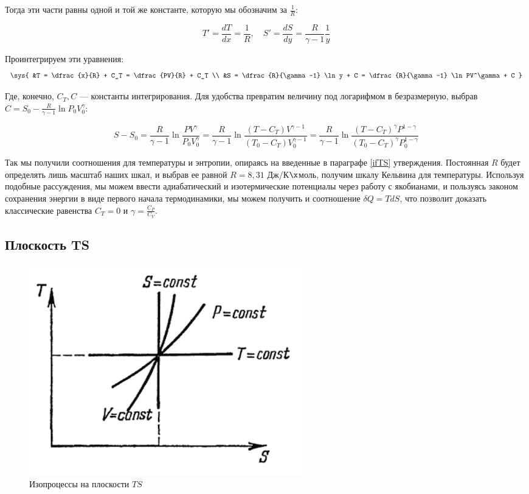 \documentclass[12pt]{kiarticle}
\newcommand{\del}{\ensuremath{\delta}}
\begin{document}
Тогда эти части равны одной и той же константе, которую мы обозначим за $ \frac{1}{R} $:

\begin{equation}\label{R}
T' = \dfrac{dT}{dx} = \dfrac{1}{R}, \quad S' = \dfrac{dS}{dy} = \dfrac{R}{\gamma - 1} \dfrac{1}{y}
\end{equation}

Проинтегрируем эти уравнения:
\begin{equation}\label{TS}
\sys{
&T = \dfrac{x}{R} + C_T = \dfrac{PV}{R}  + C_T \\
&S = \dfrac{R}{\gamma -1} \ln y + C =  \dfrac{R}{\gamma -1} \ln PV^\gamma + C
}
\end{equation} 

Где, конечно, $ C_T, C $ --- константы интегрирования. Для удобства превратим величину под логарифмом в безразмерную, выбрав $ C = S_0 - \frac{R}{\gamma -1} \ln P_0V^\gamma_0$:

\begin{equation}\label{S}
S - S_0 = \dfrac{R}{\gamma -1} \ln  \dfrac{PV^\gamma}{P_0V_0^\gamma} = \dfrac{R}{\gamma -1} \ln \dfrac{(T - C_T) V^{\gamma - 1}}{(T_0 - C_T) V^{\gamma -1 }_0} = \dfrac{R}{\gamma -1} \ln \frac{(T - C_T)^\gamma P^{1 - \gamma}}{(T_0 - C_T)^\gamma P_0^{1 -\gamma}}
\end{equation}

Так мы получили соотношения для температуры и энтропии, опираясь на введенные в параграфе \ref{ifTS} утверждения. Постоянная $ R $ будет определять лишь масштаб наших шкал, и выбрав ее равной $ R = 8,31 $ Дж/К$ \x $моль, получим шкалу Кельвина для температуры. Используя подобные рассуждения, мы можем ввести адиабатический и изотермические потенциалы через работу с якобианами, и пользуясь законом сохранения энергии в виде первого начала термодинамики, мы можем получить и соотношение $ \del Q = TdS $, что позволит доказать классические  равенства $ C_T = 0 $ и  $ \gamma = \frac{C_P}{C_V}  $.

\subsection{Плоскость TS}

\begin{figure} 
	\includegraphics{TS}
	\caption{Изопроцессы на плоскости $ TS $}
	\label{GrafTS}
\end{figure}
\end{document}
